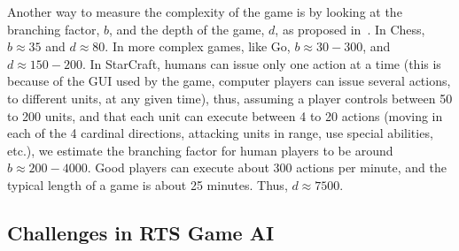 \documentclass[journal]{IEEEtran}
\begin{document}
Another way  to measure the complexity  of the game is  by looking at
the branching factor, $b$, and the depth of the game, $d$, as proposed in~\cite{Gaby}. In Chess, $b \approx 35$ and $d \approx 80$. In more complex games, like Go, $b \approx 30 - 300$, and $d \approx 150 - 200$. In StarCraft, humans can issue only one action at a time (this is because of the GUI used by the game, computer players can issue several actions, to different units, at any given time), thus, assuming a player controls between 50 to 200 units, and that each unit can execute between 4 to 20 actions (moving in each of the 4 cardinal directions, attacking units in range, use special abilities, etc.), we estimate the branching factor for human players to be around $b \approx 200 - 4000$. Good players can execute about 300 actions per minute, and the typical length of a game is about 25 minutes. Thus, $d \approx 7500$.






\subsection{Challenges in RTS Game AI}\label{subsec:challenges}
\end{document}
